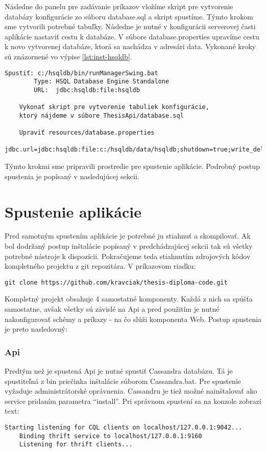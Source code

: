 	Následne do panelu pre zadávanie príkazov vložíme skript pre vytvorenie databázy konfigurácie zo súboru database.sql a skript spustíme. Týmto krokom sme vytvorili potrebné tabuľky. Následne je nutné v konfigurácii serverovej časti aplikácie nastaviť cestu k databáze. V súbore database.properties upravíme cestu k novo vytvorenej databáze, ktorá sa nachádza v adresári data. Vykonané kroky sú znázornené vo výpise \ref{lst:inst-hsqldb}.
	\begin{lstlisting}[label=lst:inst-hsqldb,caption=Vytvorenie štruktúry databázy konfigurácie]
	Spustiť: c:/hsqldb/bin/runManagerSwing.bat
		Type: HSQL Database Engine Standalone
		URL:  jdbc:hsqldb:file:hsqldb

	Vykonať skript pre vytvorenie tabuliek konfigurácie,
	ktorý nájdeme v súbore ThesisApi/database.sql
	
	Upraviť resources/database.properties
		jdbc.url=jdbc:hsqldb:file:c:/hsqldb/data/hsqldb;shutdown=true;write_delay=false;
	\end{lstlisting}	

	Týmto krokmi sme pripravili prostredie pre spustenie aplikácie. Podrobný postup spustenia je popísaný v nasledujúcej sekcii.

\section{Spustenie aplikácie}
	Pred samotným spustením aplikácie je potrebné ju stiahnuť a skompilovať. Ak bol dodržaný postup inštalácie popísaný v predchádzajúcej sekcii tak sú všetky potrebné nástroje k dispozícii. Pokračujeme teda stiahnutím zdrojových kódov kompletného projektu z git repozitára. V príkazovom riadku:
	\begin{lstlisting}[label=lst:gitclone,caption=Stiahnutie zdrojových súborov projektu]
	git clone https://github.com/kravciak/thesis-diploma-code.git
	\end{lstlisting}
	Kompletný projekt obsahuje 4 samostatné komponenty. Každá z nich sa spúšťa samostatne, avšak všetky sú závislé na Api a pred použitím je nutné nakonfigurovať schémy a príkazy - na čo slúži komponenta Web. Postup spustenia je preto nasledovný:
	
\subsubsection{Api}
	Predtým než je spustená Api je nutné spustiť Cassandra databázu. Tá je spustiteľná z bin priečinka inštalácie súborom Cassandra.bat. Pre spustenie vyžaduje administrátorské oprávnenia. Cassandru je tiež možné nainštalovať ako service pridaním parametra ``install''. Pri správnom spustení sa na konzole zobrazí text:
	\begin{lstlisting}[label=lst:thrift,caption=Spustenie databázy výsledkov]
	Starting listening for CQL clients on localhost/127.0.0.1:9042...
	Binding thrift service to localhost/127.0.0.1:9160
	Listening for thrift clients...
	\end{lstlisting}
	
